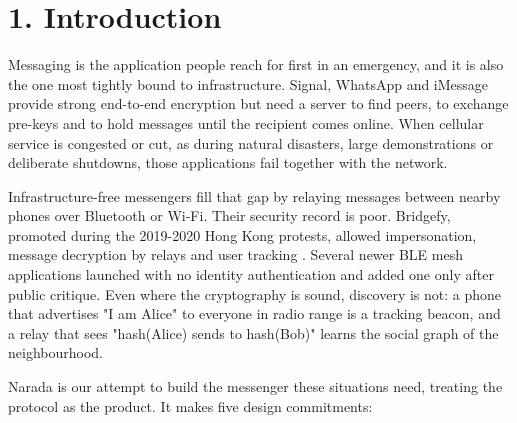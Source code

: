 \documentclass[conference]{IEEEtran}
\begin{document}
\section{1. Introduction}
Messaging is the application people reach for first in an emergency, and it is also the one most tightly bound to infrastructure. Signal, WhatsApp and iMessage provide strong end-to-end encryption \cite{ref2,ref13,ref18} but need a server to find peers, to exchange pre-keys and to hold messages until the recipient comes online. When cellular service is congested or cut, as during natural disasters, large demonstrations or deliberate shutdowns, those applications fail together with the network.

Infrastructure-free messengers fill that gap by relaying messages between nearby phones over Bluetooth or Wi-Fi. Their security record is poor. Bridgefy, promoted during the 2019-2020 Hong Kong protests, allowed impersonation, message decryption by relays and user tracking \cite{ref6,ref7}. Several newer BLE mesh applications launched with no identity authentication and added one only after public critique. Even where the cryptography is sound, discovery is not: a phone that advertises "I am Alice" to everyone in radio range is a tracking beacon, and a relay that sees "hash(Alice) sends to hash(Bob)" learns the social graph of the neighbourhood.

Narada is our attempt to build the messenger these situations need, treating the protocol as the product. It makes five design commitments:
\end{document}
